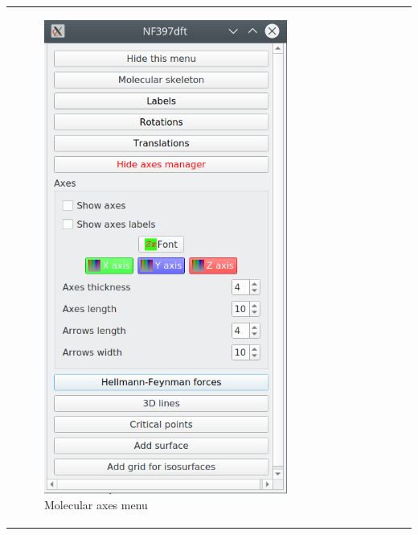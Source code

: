 \documentclass[10pt]{article}
\begin{document}
\begin{tabular}{lcr}
\begin{minipage}{.3\linewidth}
    \begin{figure}[H]
        \begin{center}
            \includegraphics[width=0.65\linewidth]{damqt320_axes.png}
        \end{center}
        \vspace*{1.5mm}
        \caption{Molecular axes menu \label{fig:4_13_5_1}}
    \end{figure}
\end{minipage}
&
\begin{minipage}{.3\linewidth}
    \begin{figure}[H]
        \begin{center}
            \vspace*{-4mm}

\end{center}
\end{figure}
\end{minipage}
\end{tabular}
\end{document}
